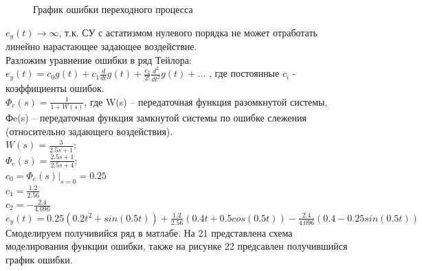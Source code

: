 \documentclass[a4paper, 11pt]{article}
\begin{document}
\newpage
    
\begin{figure}[h!]
    \caption{График ошибки переходного процесса}
    \label{tree}
\end{figure}



$e_y(t)\to\infty$, т.к. СУ с астатизмом нулевого порядка не может отработать линейно нарастающее задающее воздействие.\\

Разложим уравнение ошибки в ряд Тейлора:
$e_y(t)=c_0g(t)+c_1\frac{d}{dt}g(t)+\frac{c_2}{2!}\frac{d^2}{dt^2}g(t)+...$ , где постоянные $c_i$ - коэффициенты ошибок.\\

$\Phi_e(s)=\frac{1}{1+W(s)}$, где W(s) – передаточная функция разомкнутой системы, Фe(s) – передаточная функция замкнутой системы по ошибке слежения (относительно задающего воздействия).\\

	$W(s)=\frac {3} {2.5s+1};$ \\
	
	$\Phi_e(s)=\frac{2.5s+1}{2.5s+4};$ \\
	
	$c_0=\Phi_e(s) | _{s=0} =0.25$ \\
	
	$c_1=\frac{1.2}{2.56}$ \\
	
	$c_2=-\frac{2.4}{4.096}$ \\
	
	$e_y(t)=0.25(0.2t^2+sin(0.5t))+\frac{1.2}{2.56}(0.4t+0.5cos(0.5t))-\frac{2.4}{4.096}(0.4-0.25sin(0.5t))$\\
	
Смоделируем получивийся ряд в матлабе. На 21 представлена схема моделирования функции ошибки, также на рисунке 22 предсавлен получившийся график ошибки.
\end{document}
